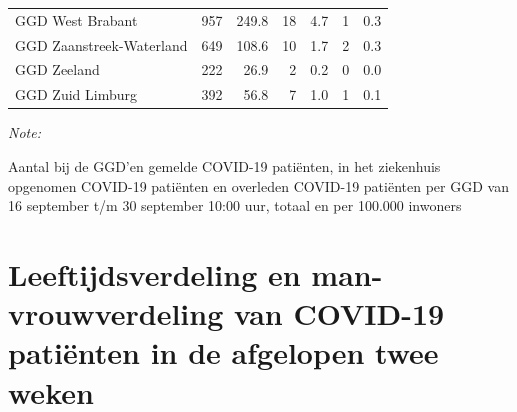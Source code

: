 \documentclass[
  english,
  man,floatsintext]{apa6}
\begin{document}
\begin{table}[H]
\begin{threeparttable}
\begin{tabular}{lrrrrrr}
GGD West Brabant & 957 & 249.8 & 18 & 4.7 & 1 & 0.3\\
GGD Zaanstreek-Waterland & 649 & 108.6 & 10 & 1.7 & 2 & 0.3\\
GGD Zeeland & 222 & 26.9 & 2 & 0.2 & 0 & 0.0\\
GGD Zuid Limburg & 392 & 56.8 & 7 & 1.0 & 1 & 0.1\\
\bottomrule
\end{tabular}
\begin{tablenotes}
\item \textit{Note: } 
\item Aantal bij de GGD’en gemelde COVID-19 patiënten, in het ziekenhuis opgenomen COVID-19 patiënten en overleden COVID-19 patiënten per GGD van 16 september t/m 30 september 10:00 uur, totaal en per 100.000 inwoners
\end{tablenotes}
\end{threeparttable}
\endgroup{}
\end{table}

\newpage

\hypertarget{leeftijdsverdeling-en-man-vrouwverdeling-van-covid-19-patiuxebnten-in-de-afgelopen-twee-weken}{%
\section{Leeftijdsverdeling en man-vrouwverdeling van COVID-19 patiënten in de afgelopen twee weken}\label{leeftijdsverdeling-en-man-vrouwverdeling-van-covid-19-patiuxebnten-in-de-afgelopen-twee-weken}}
\end{document}
